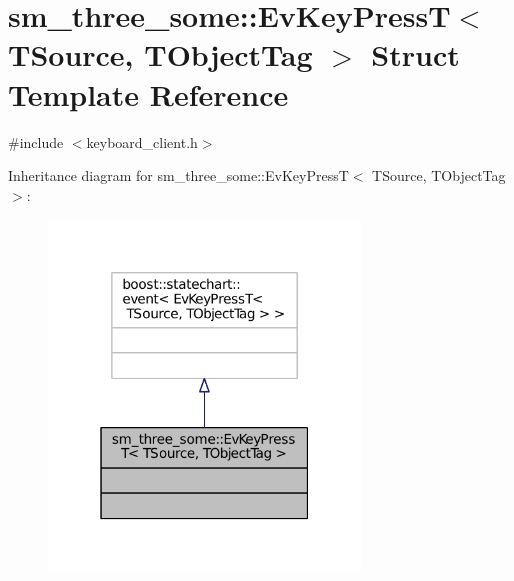 \hypertarget{structsm__three__some_1_1EvKeyPressT}{}\section{sm\+\_\+three\+\_\+some\+:\+:Ev\+Key\+PressT$<$ T\+Source, T\+Object\+Tag $>$ Struct Template Reference}
\label{structsm__three__some_1_1EvKeyPressT}


{\ttfamily \#include $<$keyboard\+\_\+client.\+h$>$}



Inheritance diagram for sm\+\_\+three\+\_\+some\+:\+:Ev\+Key\+PressT$<$ T\+Source, T\+Object\+Tag $>$\+:
\nopagebreak
\begin{figure}[H]
\begin{center}
\leavevmode
\includegraphics[width=235pt]{structsm__three__some_1_1EvKeyPressT__inherit__graph}
\end{center}
\end{figure}


